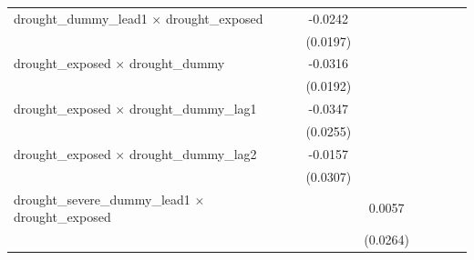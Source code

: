 \begin{tabular}{lcccccccc}
   drought\_dummy\_lead1 $\times$ drought\_exposed                    &                       &                       & -0.0242               &                       &                       &                       &                       &   \\   
                                                                      &                       &                       & (0.0197)              &                       &                       &                       &                       &   \\   
   drought\_exposed $\times$ drought\_dummy                           &                       &                       & -0.0316               &                       &                       &                       &                       &   \\   
                                                                      &                       &                       & (0.0192)              &                       &                       &                       &                       &   \\   
   drought\_exposed $\times$ drought\_dummy\_lag1                     &                       &                       & -0.0347               &                       &                       &                       &                       &   \\   
                                                                      &                       &                       & (0.0255)              &                       &                       &                       &                       &   \\   
   drought\_exposed $\times$ drought\_dummy\_lag2                     &                       &                       & -0.0157               &                       &                       &                       &                       &   \\   
                                                                      &                       &                       & (0.0307)              &                       &                       &                       &                       &   \\   
   drought\_severe\_dummy\_lead1 $\times$ drought\_exposed            &                       &                       &                       & 0.0057                &                       &                       &                       &   \\   
                                                                      &                       &                       &                       & (0.0264)              &                       &                       &                       &   \\   

\end{tabular}
